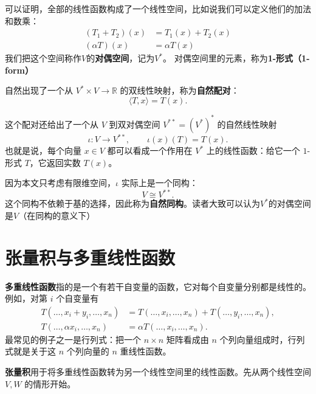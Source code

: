 \documentclass[UTF8,11pt,a4paper,fontset=fandol]{ctexart}
\numberwithin{equation}{section}
\begin{document}
可以证明，全部的线性函数构成了一个线性空间，比如说我们可以定义他们的加法和数乘：
\begin{align}
    (T_1+T_2)(x) &= T_1(x)+T_2(x) \\
    (\alpha T)(x) &= \alpha T(x)
\end{align}
我们把这个空间称作$V$的\textbf{对偶空间}，记为$V^*$。
对偶空间里的元素，称为\textbf{1-形式（1-form）}

自然出现了一个从 $V^*\times V\rightarrow\mathbb{R}$ 的双线性映射，称为\textbf{自然配对}：
\begin{equation}
    \langle T,x\rangle=T(x).
\end{equation}

这个配对还给出了一个从 $V$ 到双对偶空间 $V^{**}=(V^*)^*$ 的自然线性映射
\begin{equation}
    \iota:V\longrightarrow V^{**},\qquad
    \iota(x)(T)=T(x).
\end{equation}
也就是说，每个向量 $x\in V$ 都可以看成一个作用在 $V^*$ 上的线性函数：给它一个 $1$-形式 $T$，它返回实数 $T(x)$。

因为本文只考虑有限维空间，$\iota$ 实际上是一个同构：
\begin{equation}
    V\cong V^{**}.
\end{equation}
这个同构不依赖于基的选择，因此称为\textbf{自然同构}。读者大致可以认为$V^*$的对偶空间是$V$（在同构的意义下）
\section{张量积与多重线性函数}
\textbf{多重线性函数}指的是一个有若干自变量的函数，它对每个自变量分别都是线性的。例如，对第 $i$ 个自变量有
\begin{align}
     T(\ldots,x_i+y_i,\ldots,x_n)
     &=T(\ldots,x_i,\ldots,x_n)+T(\ldots,y_i,\ldots,x_n),\\
     T(\ldots,\alpha x_i,\ldots,x_n)
     &=\alpha T(\ldots,x_i,\ldots,x_n).
\end{align}
最常见的例子之一是行列式：把一个 $n\times n$ 矩阵看成由 $n$ 个列向量组成时，行列式就是关于这 $n$ 个列向量的 $n$ 重线性函数。

\textbf{张量积}用于将多重线性函数转为另一个线性空间里的线性函数。先从两个线性空间 $V,W$ 的情形开始。
\end{document}
